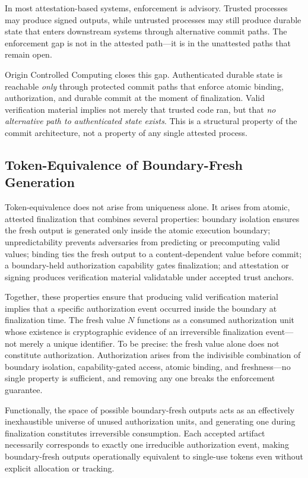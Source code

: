 \documentclass[11pt,letterpaper]{article}
\theoremstyle{occplain}
\theoremstyle{occremark}
\begin{document}
In most attestation-based systems, enforcement is advisory. Trusted processes may produce signed outputs, while untrusted processes may still produce durable state that enters downstream systems through alternative commit paths. The enforcement gap is not in the attested path---it is in the unattested paths that remain open.

Origin Controlled Computing closes this gap. Authenticated durable state is reachable \emph{only} through protected commit paths that enforce atomic binding, authorization, and durable commit at the moment of finalization. Valid verification material implies not merely that trusted code ran, but that \emph{no alternative path to authenticated state exists}. This is a structural property of the commit architecture, not a property of any single attested process.


\subsection{Token-Equivalence of Boundary-Fresh Generation}
\label{sec:token-equivalence}

Token-equivalence does not arise from uniqueness alone. It arises from atomic, attested finalization that combines several properties: boundary isolation ensures the fresh output is generated only inside the atomic execution boundary; unpredictability prevents adversaries from predicting or precomputing valid values; binding ties the fresh output to a content-dependent value before commit; a boundary-held authorization capability gates finalization; and attestation or signing produces verification material validatable under accepted trust anchors.

Together, these properties ensure that producing valid verification material implies that a specific authorization event occurred inside the boundary at finalization time. The fresh value $N$ functions as a consumed authorization unit whose existence is cryptographic evidence of an irreversible finalization event---not merely a unique identifier. To be precise: the fresh value alone does not constitute authorization. Authorization arises from the indivisible combination of boundary isolation, capability-gated access, atomic binding, and freshness---no single property is sufficient, and removing any one breaks the enforcement guarantee.

Functionally, the space of possible boundary-fresh outputs acts as an effectively inexhaustible universe of unused authorization units, and generating one during finalization constitutes irreversible consumption. Each accepted artifact necessarily corresponds to exactly one irreducible authorization event, making boundary-fresh outputs operationally equivalent to single-use tokens even without explicit allocation or tracking.
\end{document}
